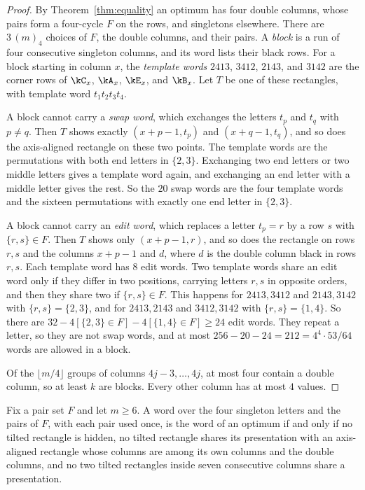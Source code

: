 \begin{proof}
By Theorem~\ref{thm:equality} an optimum has four double columns, whose pairs form a
four-cycle $F$ on the rows, and singletons elsewhere. There are $3\,(m)_4$ choices of $F$, the
double columns, and their pairs. A \emph{block} is a run of four consecutive singleton
columns, and its word lists their black rows. For a block starting in column $x$, the
\emph{template words} $2413$, $3412$, $2143$, and $3142$ are the corner rows of $\kC_x$,
$\kA_x$, $\kE_x$, and $\kB_x$. Let $T$ be one of these rectangles, with template word
$t_1t_2t_3t_4$.

A block cannot carry a \emph{swap word}, which exchanges the letters $t_p$ and $t_q$ with
$p\ne q$. Then $T$ shows exactly $(x+p-1,t_p)$ and $(x+q-1,t_q)$, and so does the
axis-aligned rectangle on these two points. The template words are the permutations with
both end letters in $\{2,3\}$. Exchanging two end letters or two middle letters gives a
template word again, and exchanging an end letter with a middle letter gives the rest. So the
$20$ swap words are the four template words and the sixteen permutations with exactly one end
letter in $\{2,3\}$.

A block cannot carry an \emph{edit word}, which replaces a letter $t_p=r$ by a row $s$ with
$\{r,s\}\in F$. Then $T$ shows only $(x+p-1,r)$, and so does the rectangle on rows $r,s$ and
the columns $x+p-1$ and $d$, where $d$ is the double column black in rows $r,s$. Each template
word has $8$ edit words. Two template words share an edit word only if they differ in two
positions, carrying letters $r,s$ in opposite orders, and then they share two if
$\{r,s\}\in F$. This happens for $2413,3412$ and $2143,3142$ with $\{r,s\}=\{2,3\}$, and for
$2413,2143$ and $3412,3142$ with $\{r,s\}=\{1,4\}$. So there are
$32-4[\{2,3\}\in F]-4[\{1,4\}\in F]\ge24$ edit words. They repeat a letter, so they are not
swap words, and at most $256-20-24=212=4^4\cdot53/64$ words are allowed in a block.

Of the $\lfloor m/4\rfloor$ groups of columns $4j-3,\ldots,4j$, at most four contain a double
column, so at least $k$ are blocks. Every other column has at most $4$ values.
\end{proof}

\begin{lemma}\label{lem:fourmemory}
Fix a pair set $F$ and let $m\ge6$. A word over the four singleton letters and the pairs of $F$, with each pair used once, is the word of an optimum if and only if no tilted rectangle is hidden, no tilted rectangle shares its presentation with an axis-aligned rectangle whose columns are among its own columns and the double columns, and no two tilted rectangles inside seven consecutive columns share a presentation.
\end{lemma}

